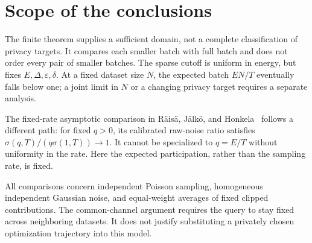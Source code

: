 \documentclass[11pt]{article}
\theoremstyle{remark}
\begin{document}
\section{Scope of the conclusions}
The finite theorem supplies a sufficient domain, not a complete classification
of privacy targets. It compares each smaller batch with full batch and does
not order every pair of smaller batches. The sparse cutoff is uniform in
energy, but fixes $E,\Delta,\varepsilon,\delta$. At a fixed dataset size $N$,
the expected batch $EN/T$ eventually falls below one; a joint limit in $N$
or a changing privacy target requires a separate analysis.

The fixed-rate asymptotic comparison in R\"ais\"a, J\"alk\"o, and
Honkela~\cite[Corollary 5.4]{raisa2024} follows a different path: for fixed
$q>0$, its calibrated raw-noise ratio satisfies
$\sigma(q,T)/(q\sigma(1,T))\to1$. It cannot be specialized to $q=E/T$
without uniformity in the rate. Here the expected participation, rather than
the sampling rate, is fixed.

All comparisons concern independent Poisson sampling, homogeneous independent
Gaussian noise, and equal-weight averages of fixed clipped contributions.
The common-channel argument requires the query to stay fixed across neighboring
datasets. It does not justify substituting a privately chosen optimization
trajectory into this model.

\clearpage
\appendix
\end{document}

